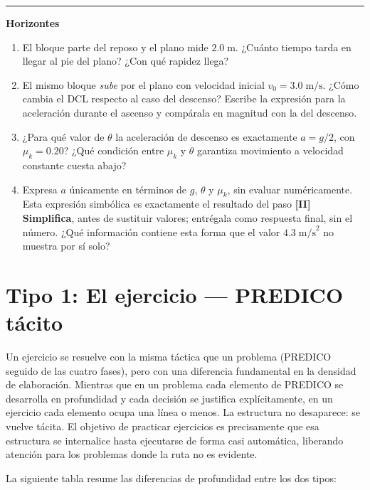 \documentclass[11pt]{book}
\begin{document}
\begin{enumerate}
\begin{description}
\medskip
\noindent\rule{\linewidth}{0.4pt}
\noindent\textbf{Horizontes}
\medskip

\begin{enumerate}
    \item El bloque parte del reposo y el plano mide $2.0\;\text{m}$. ¿Cuánto tiempo tarda en llegar al pie del plano? ¿Con qué rapidez llega?
    \item El mismo bloque {\it sube} por el plano con velocidad inicial $v_0 = 3.0\;\text{m/s}$. ¿Cómo cambia el DCL respecto al caso del descenso? Escribe la expresión para la aceleración durante el ascenso y compárala en magnitud con la del descenso.
    \item ¿Para qué valor de $\theta$ la aceleración de descenso es exactamente $a = g/2$, con $\mu_k = 0.20$? ¿Qué condición entre $\mu_k$ y $\theta$ garantiza movimiento a velocidad constante cuesta abajo?
    \item Expresa $a$ únicamente en términos de $g$, $\theta$ y $\mu_k$, sin evaluar numéricamente. Esta expresión simbólica es exactamente el resultado del paso \textbf{[II] Simplifica}, antes de sustituir valores; entrégala como respuesta final, sin el número. ¿Qué información contiene esta forma que el valor $4.3\;\text{m/s}^2$ no muestra por sí solo?
\end{enumerate}
\end{description}
\end{enumerate}

\section{Tipo 1: El ejercicio --- PREDICO tácito}

Un ejercicio se resuelve con la misma táctica que un problema (PREDICO seguido de las cuatro fases), pero con una diferencia fundamental en la densidad de elaboración. Mientras que en un problema cada elemento de PREDICO se desarrolla en profundidad y cada decisión se justifica explícitamente, en un ejercicio cada elemento ocupa una línea o menos. La estructura no desaparece: se vuelve tácita. El objetivo de practicar ejercicios es precisamente que esa estructura se internalice hasta ejecutarse de forma casi automática, liberando atención para los problemas donde la ruta no es evidente.

\medskip
La siguiente tabla resume las diferencias de profundidad entre los dos tipos:
\end{document}
